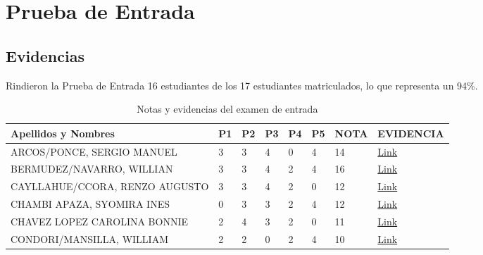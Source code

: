 \chapter{Prueba de Entrada}
\newpage



\pagestyle{empty} %

\section{Evidencias}
Rindieron la Prueba de Entrada 16 estudiantes de los 17 estudiantes matriculados, lo que representa un 94\%.


\begin{table}[hbt!]
	\caption{Notas y evidencias del examen de entrada}
	\label{tab:notas}
	\begin{tabular}{llllllll}
		\textbf{Apellidos y Nombres}        & \textbf{P1} & \textbf{P2} & \textbf{P3} & \textbf{P4} & \textbf{P5} & \textbf{NOTA} & \textbf{EVIDENCIA} \\
		\hline
		ARCOS/PONCE, SERGIO MANUEL          & 3           & 3           & 4           & 0           & 4           & 14            & \href{https://drive.google.com/open?id=1WYgqT2JCTGtzgXqbM5qQqxSmqwJcihF1}{Link}               \\
		BERMUDEZ/NAVARRO, WILLIAN    & 3           & 3           & 4           & 2           & 4           & 16            & \href{https://drive.google.com/open?id=1WYgqT2JCTGtzgXqbM5qQqxSmqwJcihF1}{Link}               \\
		CAYLLAHUE/CCORA, RENZO AUGUSTO      & 3           & 3           & 4           & 2           & 0           & 12            & \href{https://drive.google.com/open?id=1WYgqT2JCTGtzgXqbM5qQqxSmqwJcihF1}{Link}               \\
		CHAMBI APAZA, SYOMIRA INES          & 0           & 3           & 3           & 2           & 4           & 12            & \href{https://drive.google.com/open?id=1WYgqT2JCTGtzgXqbM5qQqxSmqwJcihF1}{Link}               \\
		CHAVEZ LOPEZ CAROLINA BONNIE        & 2           & 4           & 3           & 2           & 0           & 11            & \href{https://drive.google.com/open?id=1WYgqT2JCTGtzgXqbM5qQqxSmqwJcihF1}{Link}               \\
		CONDORI/MANSILLA, WILLIAM   & 2           & 2           & 0           & 2           & 4           & 10            & \href{https://drive.google.com/open?id=1WYgqT2JCTGtzgXqbM5qQqxSmqwJcihF1}{Link}               \\

\end{tabular}
\end{table}
